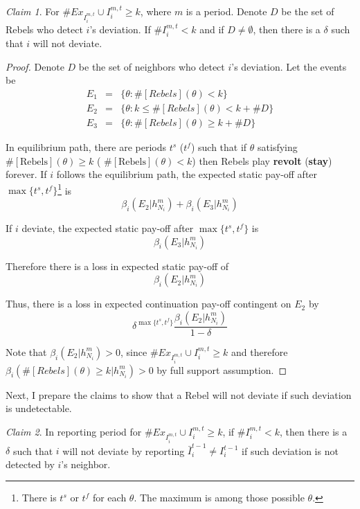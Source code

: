 \documentclass[12pt,letter]{article}
\theoremstyle{definition}
\theoremstyle{remark}
\theoremstyle{claim}
\newtheorem{claim}{Claim}
\begin{document}
\begin{claim} 
\label{claim_detection_reporting_period}
For $\#Ex_{I^{m,t}_i}\cup I^{m,t}_i\geq k$, where $m$ is a period. Denote $D$ be the set of Rebels who detect $i$'s deviation. If $\# I^{m,t}_i<k$ and if $D\neq \emptyset$, then there is a $\delta$ such that $i$ will not deviate.
\end{claim}
\begin{proof}

Denote $D$ be the set of neighbors who detect $i$'s deviation. Let the events be
\begin{eqnarray*}
E_1 	&= &\{\theta: \#[Rebels](\theta)< k\}\\
E_2 	&= &\{\theta: k\leq \#[Rebels](\theta)<k+\# D\}\\
E_3 	&= &\{\theta: \#[Rebels](\theta)\geq k+\# D\}
\end{eqnarray*}

In equilibrium path, there are periods $t^{s}$ ($t^{f}$) such that if $\theta$ satisfying $\#[\text{Rebels}](\theta)\geq k$ ( $\#[\text{Rebels}](\theta)< k$) then Rebels play \textbf{revolt} (\textbf{stay}) forever. If $i$ follows the equilibrium path, the expected static pay-off after $\max\{t^s,t^f\}$\footnote{There is $t^{s}$ or $t^{f}$ for each $\theta$. The maximum is among those possible $\theta$.} is
 \[\beta_{i}(E_2|h^{m}_{N_i})+\beta_{i}(E_3|h^{m}_{N_i})\]

If $i$ deviate, the expected static pay-off after $\max\{t^s,t^f\}$ is
 \[\beta_{i}(E_3|h^{m}_{N_i})\]
 
Therefore there is a loss in expected static pay-off of
\[\beta_{i}(E_2|h^{m}_{N_i})\]

Thus, there is a loss in expected continuation pay-off contingent on $E_2$ by
\[\delta^{\max\{t^s,t^f\}}\frac{\beta_{i}(E_2|h^{m}_{N_i})}{1-\delta}\]

Note that $\beta_{i}(E_2|h^{m}_{N_i})>0$, since $\#Ex_{I^{m,t}_i}\cup I^{m,t}_i\geq k$ and therefore $\beta_{i}(\#[Rebels](\theta)\geq k|h^{m}_{N_i})>0$ by full support assumption.
\end{proof}


Next, I prepare the claims to show that a Rebel will not deviate if such deviation is undetectable.

\begin{claim} 
\label{claim_deviation_higher_reporting}
In reporting period for $\# Ex_{I^{m,t}_i}\cup I^{m,t}_i \geq k$, if $\# I^{m,t}_i<k$, then there is a $\delta$ such that $i$ will not deviate by reporting $\bar{I}^{t-1}_i\neq I^{t-1}_i$ if such deviation is not detected by $i$'s neighbor.
\end{claim}
\end{document}
